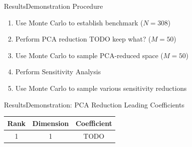 \documentclass{beamer}
\begin{document}
\begin{frame}{Results}{Demonstration Procedure}\vspace{-30pt}
  \begin{enumerate}
    \item Use Monte Carlo to establish benchmark ($N=308$)
    \item Perform PCA reduction TODO keep what? ($M=50$)
    \item Use Monte Carlo to sample PCA-reduced space ($M=50$)
    \item Perform Sensitivity Analysis
    \item Use Monte Carlo to sample various sensitivity reductions
  \end{enumerate}
\end{frame}

\begin{frame}{Results}{Demonstration: PCA Reduction}\vspace{-30pt}
  Leading Coefficients
  \begin{tabular}{c|c|c}
    Rank & Dimension & Coefficient \\ \hline
    1 & 1 & TODO
  \end{tabular}
\end{frame}
\end{document}
